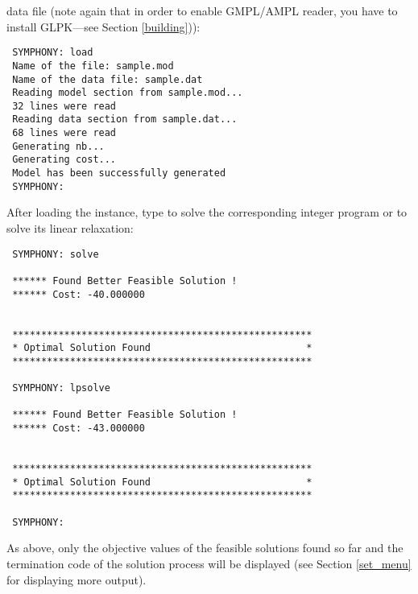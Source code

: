 data file (note again that in order to enable GMPL/AMPL reader, you have to
install GLPK---see Section
\ref{building})): 
{\color{Brown}
\begin{verbatim}
 SYMPHONY: load 
 Name of the file: sample.mod
 Name of the data file: sample.dat
 Reading model section from sample.mod...
 32 lines were read
 Reading data section from sample.dat...
 68 lines were read
 Generating nb...
 Generating cost...
 Model has been successfully generated
 SYMPHONY:
\end{verbatim}
}
After loading the instance, type  to solve the 
corresponding integer program or  to solve its linear
relaxation:
{\color{Brown}
\begin{verbatim}
 SYMPHONY: solve

 ****** Found Better Feasible Solution !
 ****** Cost: -40.000000


 ****************************************************
 * Optimal Solution Found                           *
 ****************************************************

 SYMPHONY: lpsolve

 ****** Found Better Feasible Solution !
 ****** Cost: -43.000000


 ****************************************************
 * Optimal Solution Found                           *
 ****************************************************

 SYMPHONY:
\end{verbatim}
}
As above, only the objective values of the feasible solutions found so far and 
the termination code of the solution process will be displayed (see Section 
\ref{set_menu} for displaying more output).

